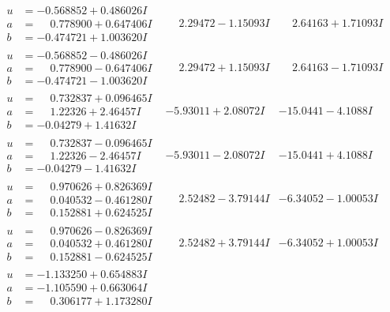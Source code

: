 \documentclass[1p]{elsarticle_modified}
\theoremstyle{definition}
\begin{document}
$$\begin{array}{c|c|c}
\begin{aligned}
u &= -0.568852 + 0.486026 I \\
a &= \phantom{-}0.778900 + 0.647406 I \\
b &= -0.474721 + 1.003620 I\end{aligned}
 & \phantom{-}2.29472 - 1.15093 I & \phantom{-}2.64163 + 1.71093 I \\ \hline\begin{aligned}
u &= -0.568852 - 0.486026 I \\
a &= \phantom{-}0.778900 - 0.647406 I \\
b &= -0.474721 - 1.003620 I\end{aligned}
 & \phantom{-}2.29472 + 1.15093 I & \phantom{-}2.64163 - 1.71093 I \\ \hline\begin{aligned}
u &= \phantom{-}0.732837 + 0.096465 I \\
a &= \phantom{-}1.22326 + 2.46457 I \\
b &= -0.04279 + 1.41632 I\end{aligned}
 & -5.93011 + 2.08072 I & -15.0441 - 4.1088 I \\ \hline\begin{aligned}
u &= \phantom{-}0.732837 - 0.096465 I \\
a &= \phantom{-}1.22326 - 2.46457 I \\
b &= -0.04279 - 1.41632 I\end{aligned}
 & -5.93011 - 2.08072 I & -15.0441 + 4.1088 I \\ \hline\begin{aligned}
u &= \phantom{-}0.970626 + 0.826369 I \\
a &= \phantom{-}0.040532 - 0.461280 I \\
b &= \phantom{-}0.152881 + 0.624525 I\end{aligned}
 & \phantom{-}2.52482 - 3.79144 I & -6.34052 - 1.00053 I \\ \hline\begin{aligned}
u &= \phantom{-}0.970626 - 0.826369 I \\
a &= \phantom{-}0.040532 + 0.461280 I \\
b &= \phantom{-}0.152881 - 0.624525 I\end{aligned}
 & \phantom{-}2.52482 + 3.79144 I & -6.34052 + 1.00053 I \\ \hline\begin{aligned}
u &= -1.133250 + 0.654883 I \\
a &= -1.105590 + 0.663064 I \\
b &= \phantom{-}0.306177 + 1.173280 I\end{aligned}

\end{array}$$
\end{document}
